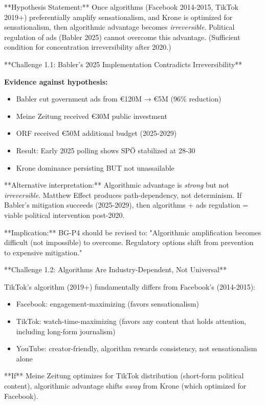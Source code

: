 **Hypothesis Statement:** Once algorithms (Facebook 2014-2015, TikTok 2019+) preferentially amplify sensationalism, and Krone is optimized for sensationalism, then algorithmic advantage becomes \textit{irreversible}. Political regulation of ads (Babler 2025) cannot overcome this advantage. (Sufficient condition for concentration irreversibility after 2020.)

**Challenge 1.1: Babler's 2025 Implementation Contradicts Irreversibility**

\textbf{Evidence against hypothesis:}
\begin{itemize}
\item Babler cut government ads from €120M → €5M (96\% reduction)
\item Meine Zeitung received €30M public investment
\item ORF received €50M additional budget (2025-2029)
\item Result: Early 2025 polling shows SPÖ stabilized at 28-30%
\item Krone dominance persisting BUT not unassailable
\end{itemize}

**Alternative interpretation:** Algorithmic advantage is \textit{strong} but not \textit{irreversible}. Matthew Effect produces path-dependency, not determinism. If Babler's mitigation succeeds (2025-2029), then algorithms + ads regulation = viable political intervention post-2020.

**Implication:** BG-P4 should be revised to: "Algorithmic amplification becomes difficult (not impossible) to overcome. Regulatory options shift from prevention to expensive mitigation."

**Challenge 1.2: Algorithms Are Industry-Dependent, Not Universal**

TikTok's algorithm (2019+) fundamentally differs from Facebook's (2014-2015):
\begin{itemize}
\item Facebook: engagement-maximizing (favors sensationalism)
\item TikTok: watch-time-maximizing (favors any content that holds attention, including long-form journalism)
\item YouTube: creator-friendly, algorithm rewards consistency, not sensationalism alone
\end{itemize}

**If** Meine Zeitung optimizes for TikTok distribution (short-form political content), algorithmic advantage shifts \textit{away} from Krone (which optimized for Facebook).

